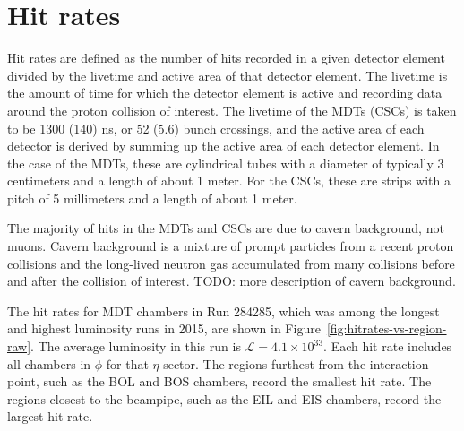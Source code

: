 \section{Hit rates}
\label{sec:hitrates}

Hit rates are defined as the number of hits recorded in a given detector element divided by the livetime and active area of that detector element. The livetime is the amount of time for which the detector element is active and recording data around the proton collision of interest. The livetime of the MDTs (CSCs) is taken to be 1300 (140) ns, or 52 (5.6) bunch crossings, and the active area of each detector is derived by summing up the active area of each detector element. In the case of the MDTs, these are cylindrical tubes with a diameter of typically 3 centimeters and a length of about 1 meter. For the CSCs, these are strips with a pitch of 5 millimeters and a length of about 1 meter.

The majority of hits in the MDTs and CSCs are due to cavern background, not muons. Cavern background is a mixture of prompt particles from a recent proton collisions and the long-lived neutron gas accumulated from many collisions before and after the collision of interest. TODO: more description of cavern background.

The hit rates for MDT chambers in Run 284285, which was among the longest and highest luminosity runs in 2015, are shown in Figure~\ref{fig:hitrates-vs-region-raw}. The average luminosity in this run is $\mathcal{L}=4.1\times10^{33}$. Each hit rate includes all chambers in $\phi$ for that $\eta$-sector. The regions furthest from the interaction point, such as the BOL and BOS chambers, record the smallest hit rate. The regions closest to the beampipe, such as the EIL and EIS chambers, record the largest hit rate.

